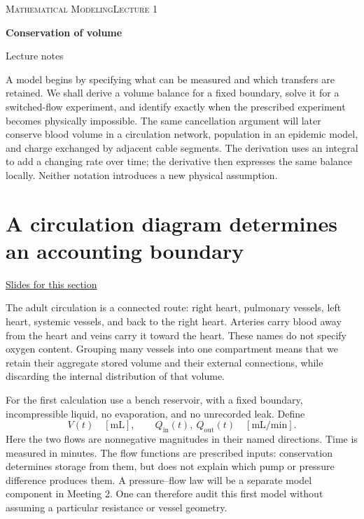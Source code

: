 \documentclass[11pt,letterpaper]{article}
\theoremstyle{definition}\newtheorem{definition}{Definition}\newtheorem{example}{Example}
\numberwithin{equation}{section}
\begin{document}
{\small\scshape Mathematical Modeling\hfill Lecture 1}\par\medskip
{\raggedright{}\LARGE\bfseries\color{ink} Conservation of volume\par}\medskip
{\small Lecture notes}\par\bigskip
A model begins by specifying what can be measured and which transfers are retained. We shall derive a volume balance for a fixed boundary, solve it for a switched-flow experiment, and identify exactly when the prescribed experiment becomes physically impossible. The same cancellation argument will later conserve blood volume in a circulation network, population in an epidemic model, and charge exchanged by adjacent cable segments. The derivation uses an integral to add a changing rate over time; the derivative then expresses the same balance locally. Neither notation introduces a new physical assumption.

\section{A circulation diagram determines an accounting boundary}
\hypertarget{note-a-circulation-diagram-determines-an-accounting-boundary}{}\label{note:a-circulation-diagram-determines-an-accounting-boundary}
{\small \href{slides.html\#frame=compartment-volume-and-boundary-flux\&step=1}{Slides for this section}}\par
The adult circulation is a connected route: right heart, pulmonary vessels, left heart, systemic vessels, and back to the right heart. Arteries carry blood away from the heart and veins carry it toward the heart. These names do not specify oxygen content. Grouping many vessels into one compartment means that we retain their aggregate stored volume and their external connections, while discarding the internal distribution of that volume.

For the first calculation use a bench reservoir, with a fixed boundary, incompressible liquid, no evaporation, and no unrecorded leak. Define
\[
V(t)\quad[\mathrm{mL}],\qquad Q_{\mathrm{in}}(t),\ Q_{\mathrm{out}}(t)\quad[\mathrm{mL}/\mathrm{min}].
\]
Here the two flows are nonnegative magnitudes in their named directions. Time is measured in minutes. The flow functions are prescribed inputs: conservation determines storage from them, but does not explain which pump or pressure difference produces them. A pressure--flow law will be a separate model component in Meeting 2. One can therefore audit this first model without assuming a particular resistance or vessel geometry.
\end{document}
